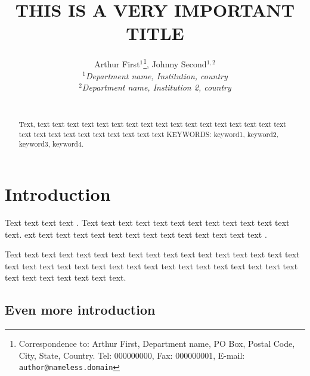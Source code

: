 \documentclass[11pt, a4paper]{article}
\begin{document}
\title{THIS IS A VERY IMPORTANT TITLE}

\author{Arthur First$^{1}$\thanks{Correspondence to: Arthur First, Department name, PO Box, Postal Code, City, State, Country. Tel: 000000000, Fax: 000000001, E-mail: \texttt{author@nameless.domain}}, Johnny Second$^{1,2}$\\
\small{\textsl{$^1$Department name, Institution, country}}\\
\small{\textsl{$^2$Department name, Institution 2, country}}\\
\newline\\
\date{}}
\maketitle
\thispagestyle{empty}

\newpage
\setcounter{page}{1}
\begin{abstract}
Text, text text text text text text text text text text text text text text text text text text text text text text text text text text text
\noindent KEYWORDS: keyword1, keyword2, keyword3, keyword4.
\end{abstract}

\section{Introduction}
\label{s:intro}
Text text text text \cite{Little1987}. Text text text text text text text text text text  text text text. ext text text text text text text text text text text text text text \cite{AgrestiA2002,Boggs1982,Cowan1980,Rubin2009,Scott1950,WarnerSL1965}. 

Text text text text text text text text text text text text text text text text text text text text text text text text text text text  text text text text text text text text text text text text text text.

\subsection{Even more introduction}
\label{s:subintro}

\newpage


\end{document}
